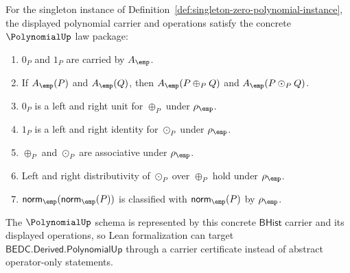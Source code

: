 \begin{theorem}
\label{thm:singleton-zero-polynomial-laws}
For the singleton instance of
Definition~\ref{def:singleton-zero-polynomial-instance}, the displayed
polynomial carrier and operations satisfy the concrete $\PolynomialUp$ law
package:
\begin{enumerate}
  \item $0_P$ and $1_P$ are carried by $A_{\emp}$.
  \item If $A_{\emp}(P)$ and $A_{\emp}(Q)$, then
  $A_{\emp}(P\oplus_P Q)$ and $A_{\emp}(P\odot_P Q)$.
  \item $0_P$ is a left and right unit for $\oplus_P$ under $\rho_{\emp}$.
  \item $1_P$ is a left and right identity for $\odot_P$ under $\rho_{\emp}$.
  \item $\oplus_P$ and $\odot_P$ are associative under $\rho_{\emp}$.
  \item Left and right distributivity of $\odot_P$ over $\oplus_P$ hold under
  $\rho_{\emp}$.
  \item $\mathsf{norm}_{\emp}(\mathsf{norm}_{\emp}(P))$ is classified with
  $\mathsf{norm}_{\emp}(P)$ by $\rho_{\emp}$.
\end{enumerate}
The $\PolynomialUp$ schema is represented by this concrete $\mathsf{BHist}$
carrier and its displayed operations, so Lean formalization can target
$\mathsf{BEDC.Derived.PolynomialUp}$ through a carrier certificate instead of
abstract operator-only statements.
\end{theorem}
